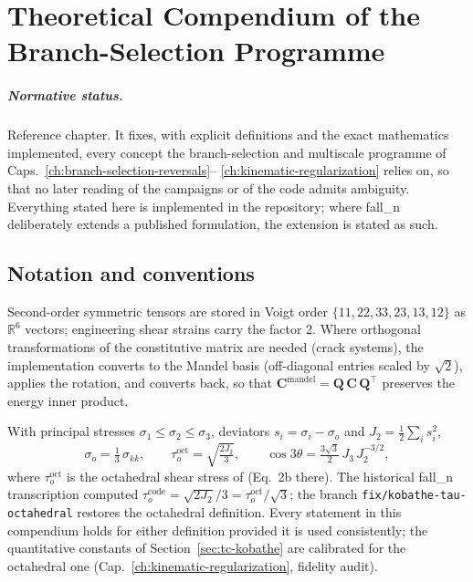 
\chapter{Theoretical Compendium of the Branch-Selection Programme}
\label{ch:theoretical-compendium}

\paragraph{Normative status.}
Reference chapter. It fixes, with explicit definitions and the exact
mathematics implemented, every concept the branch-selection and
multiscale programme of Caps.~\ref{ch:branch-selection-reversals}--%
\ref{ch:kinematic-regularization} relies on, so that no later reading
of the campaigns or of the code admits ambiguity. Everything stated
here is implemented in the repository; where fall\_n deliberately
extends a published formulation, the extension is stated as such.

\section{Notation and conventions}
\label{sec:tc-notation}

\begin{definition}
Second-order symmetric tensors are stored in Voigt order
$\{11,22,33,23,13,12\}$ as $\mathbb{R}^6$ vectors; engineering shear
strains carry the factor 2. Where orthogonal transformations of the
constitutive matrix are needed (crack systems), the implementation
converts to the Mandel basis (off-diagonal entries scaled by
$\sqrt2$), applies the rotation, and converts back, so that
$\mathbf{C}^{\text{mandel}} = \mathbf{Q}\,\mathbf{C}\,\mathbf{Q}^\top$
preserves the energy inner product.
\end{definition}

\begin{definition}
\label{def:tc-invariants}
With principal stresses $\sigma_1\le\sigma_2\le\sigma_3$, deviators
$s_i = \sigma_i - \sigma_o$ and $J_2 = \tfrac12\sum_i s_i^2$,
\[
  \sigma_o = \tfrac13\,\sigma_{kk}, \qquad
  \tau_o^{\text{oct}} = \sqrt{\tfrac{2J_2}{3}}, \qquad
  \cos 3\theta = \tfrac{3\sqrt3}{2}\, J_3\, J_2^{-3/2},
\]
where $\tau_o^{\text{oct}}$ is the octahedral shear stress of
\cite{KoBathe2026} (Eq.~2b there). The historical fall\_n
transcription computed $\tau_o^{\text{code}} = \sqrt{2J_2}/3 =
\tau_o^{\text{oct}}/\sqrt3$; the branch
\texttt{fix/kobathe-tau-octahedral} restores the octahedral
definition. Every statement in this compendium holds for either
definition provided it is used consistently; the quantitative
constants of Section~\ref{sec:tc-kobathe} are calibrated for the
octahedral one (Cap.~\ref{ch:kinematic-regularization},
fidelity audit).
\end{definition}

